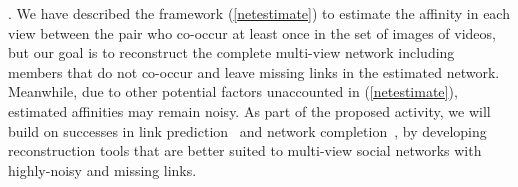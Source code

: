 
\label{sec:reconstruct}


. We have described the framework (\ref{netestimate}) to estimate the affinity in each view between the pair who co-occur at least once in the set of images of videos, but our goal is to reconstruct the complete multi-view network including members that do not co-occur and leave missing links in the estimated network. Meanwhile, due to other potential factors unaccounted in (\ref{netestimate}), estimated affinities may remain noisy.  As part of the proposed activity, we will build on successes in link prediction~\cite{Goldberg,Liben-Nowell,TaskarWAK03} and network completion~\cite{Clauset,Guimera,HannekeX09,KimL11}, by developing reconstruction tools that are better suited to multi-view social networks with highly-noisy and missing links.


